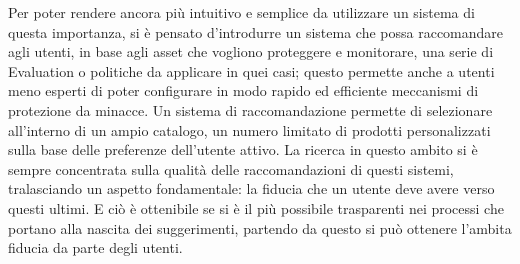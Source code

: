 \hfill\break
Per poter rendere ancora più intuitivo e semplice da utilizzare un sistema di questa importanza, si è pensato d'introdurre un sistema 
che possa raccomandare agli utenti, in base agli asset che vogliono proteggere e monitorare, una serie di Evaluation o politiche da 
applicare in quei casi; questo permette anche a utenti meno esperti di poter configurare in modo rapido ed efficiente meccanismi di 
protezione da minacce. Un sistema di raccomandazione permette di selezionare all’interno di un ampio catalogo, un numero limitato di prodotti 
personalizzati sulla base delle preferenze dell’utente attivo. La ricerca in questo ambito si è sempre concentrata sulla qualità delle 
raccomandazioni di questi sistemi, tralasciando un aspetto fondamentale: la fiducia che un utente deve avere verso questi ultimi. 
E ciò è ottenibile se si è il più possibile trasparenti nei processi che portano alla nascita dei suggerimenti, partendo da questo 
si può ottenere l'ambita fiducia da parte degli utenti.

